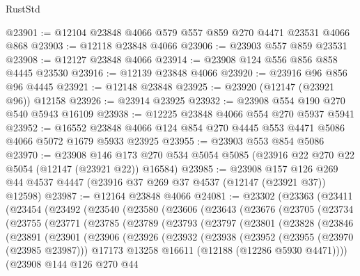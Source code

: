 \begin{lexlean}{RustStd}
\begin{coremodule}
@23901 := @12104 @23848 @4066 @579 @557 @859 @270 @4471 @23531 @4066 @868
@23903 := @12118 @23848 @4066
@23906 := @23903 @557 @859 @23531
@23908 := @12127 @23848 @4066
@23914 := @23908 @124 @556 @856 @858 @4445 @23530
@23916 := @12139 @23848 @4066
@23920 := @23916 @96 @856 @96 @4445
@23921 := @12148 @23848
@23925 := @23920 (@12147 (@23921 @96)) @12158
@23926 := @23914 @23925
@23932 := @23908 @554 @190 @270 @540 @5943 @16109
@23938 := @12225 @23848 @4066 @554 @270 @5937 @5941
@23952 := @16552 @23848 @4066 @124 @854 @270 @4445 @553 @4471 @5086 @4066 @5072 @1679 @5933 @23925
@23955 := @23903 @553 @854 @5086
@23970 := @23908
    @146
    @173
    @270
    @534
    @5054
    @5085
    (@23916 @22 @270 @22 @5054 (@12147 (@23921 @22)) @16584)
@23985 := @23908
    @157
    @126
    @269
    @44
    @4537
    @4447
    (@23916 @37 @269 @37 @4537 (@12147 (@23921 @37)) @12598)
@23987 := @12164 @23848 @4066
@24081 := @23302
    (@23363
      (@23411
        (@23454
          (@23492
            (@23540
              (@23580
                (@23606
                  (@23643
                    (@23676
                      (@23705
                        (@23734
                          (@23755
                            (@23771
                              (@23785
                                (@23789
                                  (@23793
                                    (@23797
                                      (@23801
                                        (@23828
                                          (@23846
                                            (@23891
                                              (@23901
                                                (@23906
                                                  (@23926
                                                    (@23932
                                                      (@23938
                                                        (@23952
                                                          (@23955 (@23970 (@23985 @23987)))
                                                          @17173
                                                          @13258
                                                          @16611
                                                          (@12188 (@12286 @5930 @4471))))
                                                      (@23908
                                                        @144
                                                        @126
                                                        @270
                                                        @44

\end{coremodule}
\end{lexlean}
